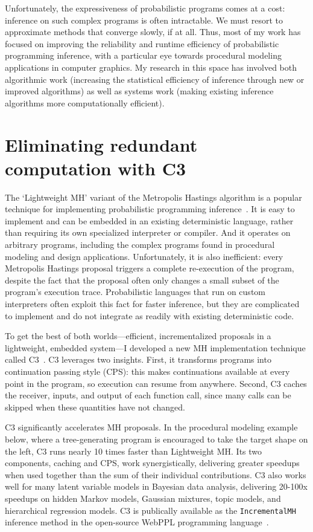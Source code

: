 \documentclass[
10pt, %
a4paper, %
oneside, %
headinclude,footinclude, %
BCOR5mm, %
]{scrartcl}
\begin{document}
Unfortunately, the expressiveness of probabilistic programs comes at a cost: inference on such complex programs is often intractable. We must resort to approximate methods that converge slowly, if at all. Thus, most of my work has focused on improving the reliability and runtime efficiency of probabilistic programming inference, with a particular eye towards procedural modeling applications in computer graphics. My research in this space has involved both algorithmic work (increasing the statistical efficiency of inference through new or improved algorithms) as well as systems work (making existing inference algorithms more computationally efficient).





\section*{Eliminating redundant computation with C3}

The `Lightweight MH' variant of the Metropolis Hastings algorithm is a popular technique for implementing probabilistic programming inference~\cite{Lightweight}. It is easy to implement and can be embedded in an existing deterministic language, rather than requiring its own specialized interpreter or compiler. And it operates on arbitrary programs, including the complex programs found in procedural modeling and design applications. Unfortunately, it is also inefficient: every Metropolis Hastings proposal triggers a complete re-execution of the program, despite the fact that the proposal often only changes a small subset of the program's execution trace. Probabilistic languages that run on custom interpreters often exploit this fact for faster inference, but they are complicated to implement and do not integrate as readily with existing deterministic code.

To get the best of both worlds---efficient, incrementalized proposals in a lightweight, embedded system---I developed a new MH implementation technique called C3~\cite{C3}. C3 leverages two insights. First, it transforms programs into continuation passing style (CPS): this makes continuations available at every point in the program, so execution can resume from anywhere. Second, C3 caches the receiver, inputs, and output of each function call, since many calls can be skipped when these quantities have not changed.

C3 significantly accelerates MH proposals. In the procedural modeling example below, where a tree-generating program is encouraged to take the target shape on the left, C3 runs nearly 10 times faster than Lightweight MH. Its two components, caching and CPS, work synergistically, delivering greater speedups when used together than the sum of their individual contributions. C3 also works well for many latent variable models in Bayesian data analysis, delivering 20-100x speedups on hidden Markov models, Gaussian mixtures, topic models, and hierarchical regression models. C3 is publically available as the \texttt{IncrementalMH} inference method in the open-source WebPPL programming language~\cite{WebPPL}.
\end{document}
